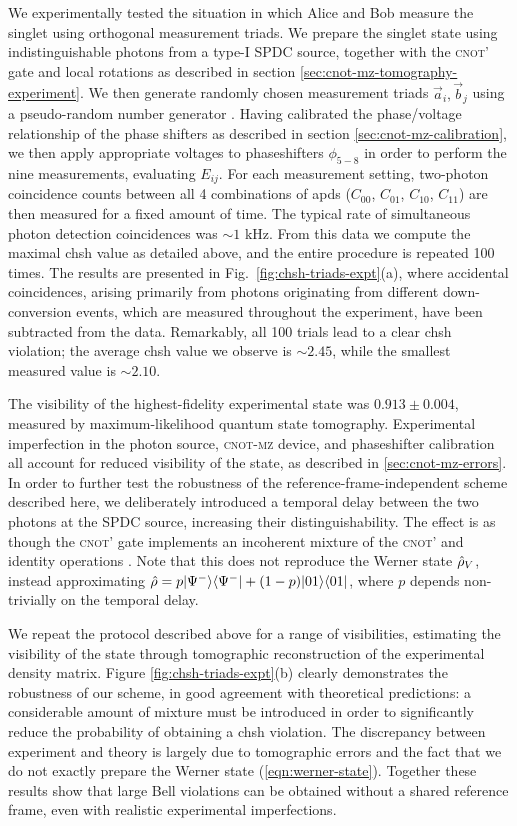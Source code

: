 We experimentally tested the situation in which Alice and Bob measure the singlet using orthogonal measurement triads. 
We prepare the singlet state using indistinguishable photons from a type-I SPDC source, together with the \textsc{cnot}' gate and local rotations as described in section \ref{sec:cnot-mz-tomography-experiment}. 
We then generate randomly chosen measurement triads $\vec{a}_i, \vec{b}_j$ using a pseudo-random number generator \cite{Mezzadri2006}.
Having calibrated the phase/voltage relationship of the phase shifters as described in section \ref{sec:cnot-mz-calibration}, we then apply appropriate voltages to phaseshifters 
$\phi_{5-8}$
in order to perform the nine measurements, evaluating $E_{ij}$.
For each measurement setting, two-photon coincidence counts between all 4 combinations of \glspl{apd} ($C_{00}$, $C_{01}$, $C_{10}$, $C_{11}$) are then measured for a fixed amount of time. The typical rate of simultaneous photon detection coincidences was $\sim1$ kHz. 
From this data we compute the maximal \gls{chsh} value as detailed above,  and the entire procedure is repeated 100 times. 
The results are presented in Fig.~\ref{fig:chsh-triads-expt}(a), where accidental coincidences, arising primarily from photons originating from different down-conversion events, which are measured throughout the experiment, have been subtracted from the data. 
Remarkably, all 100 trials lead to a clear \gls{chsh} violation; the average \gls{chsh} value we observe is $\sim 2.45$, while the smallest measured value is $\sim 2.10$. 

The visibility of the highest-fidelity experimental state was $0.913\pm0.004$, measured by maximum-likelihood quantum state tomography. 
Experimental imperfection in the photon source, \textsc{cnot-mz} device, and phaseshifter calibration all account for reduced visibility of the state, as described in \ref{sec:cnot-mz-errors}. 
In order to further test the robustness of the reference-frame-independent scheme described here, we deliberately introduced a temporal delay between the two photons at the SPDC source, increasing their distinguishability. 
The effect is as though the \textsc{cnot}' gate implements an incoherent mixture of the \textsc{cnot}' and identity operations \cite{OBrien2003}. 
Note that this does not reproduce the Werner state $\hat{\rho}_V$, instead approximating
$ \hat{\rho} =p \mbox{$ | \Psi^- \rangle $}\mbox{$ \langle \Psi^- | $} + (1-p) \mbox{$ | 01 \rangle $}\mbox{$ \langle 01 | $}$, where $p$ depends non-trivially on the temporal delay.

We repeat the protocol described above for a range of visibilities, estimating the visibility of the state through tomographic reconstruction of the experimental density matrix.  Figure \ref{fig:chsh-triads-expt}(b) clearly demonstrates the robustness of our scheme, in good agreement with theoretical predictions: a considerable amount of mixture must be introduced in order to significantly reduce the probability of obtaining a \gls{chsh} violation.  The discrepancy between experiment and theory is largely due to tomographic errors and the fact that we do not exactly prepare the Werner state (\ref{eqn:werner-state}).  Together these results show that large Bell violations can be obtained without a shared reference frame, even with realistic experimental imperfections. 

